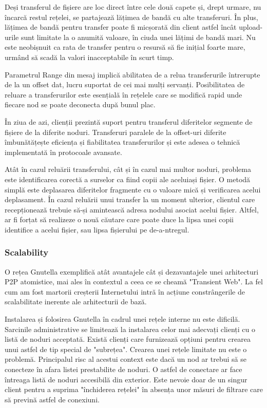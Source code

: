 Deși transferul de fișiere are loc direct între cele două capete și, drept
urmare, nu încarcă restul rețelei, se partajează lățimea de bandă cu alte
transferuri. În plus, lățimea de bandă pentru transfer poate fi micșorată din
client astfel încât upload-urile sunt limitate la o anumită valoare, în ciuda
unei lățimi de bandă mari. Nu este neobișnuit ca rata de transfer pentru o
resursă să fie inițial foarte mare, urmând să scadă la valori inacceptabile în
scurt timp.

Parametrul Range din mesaj implică abilitatea de a relua transferurile
întrerupte de la un offset dat, lucru suportat de cei mai mulți servanți.
Posibilitatea de reluare a transferurilor este esențială în rețelele care se
modifică rapid unde fiecare nod se poate deconecta după bunul plac.

În ziua de azi, clienții prezintă suport pentru transferul diferitelor
segmente de fișiere de la diferite noduri. Transferuri paralele de la
offset-uri diferite îmbunătățește eficiența și fiabilitatea transferurilor și
este adesea o tehnică implementată în protocoale avansate.

Atât în cazul reluării transferului, cât și în cazul mai multor noduri,
problema este identificarea corectă a surselor ca fiind copii ale aceluiași
fișier. O metodă simplă este deplasarea diferitelor fragmente cu o valoare
mică și verificarea acelui deplasament. În cazul reluării unui transfer la un
moment ulterior, clientul care recepționează trebuie să-și amintească adresa
nodului asociat acelui fișier. Altfel, ar fi forțat să realizeze o nouă
căutare care poate duce la lipsa unei copii identifice a acelui fișier, sau
lipsa fișierului pe de-a-ntregul.

\subsubsection{Scalability}

O rețea Gnutella exemplifică atât avantajele cât și dezavantajele unei
arhitecturi P2P atomistice, mai ales în contextul a ceea ce se cheamă
"Transient Web". La fel cum am fost martorii creșterii Internetului intră în
acțiune constrângerile de scalabilitate inerente ale arhitecturii de bază.

Instalarea și folosirea Gnutella în cadrul unei rețele interne nu este
dificilă. Sarcinile administrative se limitează la instalarea celor mai
adecvați clienți cu o listă de noduri acceptată. Există clienți care
furnizează opțiuni pentru crearea unui astfel de tip special de "subrețea".
Crearea unei rețele limitate nu este o problemă. Principalul risc al acestui
context este dacă un nod ar trebui să se conecteze în afara listei
prestabilite de noduri. O astfel de conectare ar face întreaga listă de noduri
accesibilă din exterior. Este nevoie doar de un singur client pentru a suprima
"închiderea rețelei" în absența unor măsuri de filtrare care să prevină astfel
de conexiuni.

